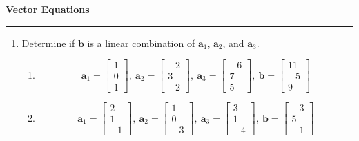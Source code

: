 \documentclass[12pt]{article}
\begin{document}
\begin{center}
{\bf \Large Vector Equations}
\vspace{0.2cm}
\hrule
\end{center}

	\begin{enumerate}
		\item Determine if $\mathbf{b}$ is a linear combination of $\mathbf{a}_1$, $\mathbf{a}_2$, and $\mathbf{a}_3$.
		\begin{enumerate}
		\item
		\[
		\mathbf{a}_1 = \begin{bmatrix}
			1\\ 0\\ 1
		\end{bmatrix},\ \mathbf{a}_2 = \begin{bmatrix}
			-2\\ 3\\ -2	
		\end{bmatrix},\ \mathbf{a}_3 = \begin{bmatrix}
			-6\\ 7\\ 5
		\end{bmatrix},\ 
		\mathbf{b} = \begin{bmatrix}
			11\\-5\\9
		\end{bmatrix}
		\]
		\vfill

		\item \[
		\mathbf{a}_1 = \begin{bmatrix}
			2\\1\\-1
		\end{bmatrix},\ \mathbf{a}_2 = \begin{bmatrix}
			1\\0\\-3
		\end{bmatrix},\ \mathbf{a}_3 = \begin{bmatrix}
			3\\1\\-4
		\end{bmatrix},\ 
		\mathbf{b} = \begin{bmatrix}
			-3\\5\\-1
		\end{bmatrix}
		\]
		\vfill
	\end{enumerate}


\end{enumerate}
\end{document}
